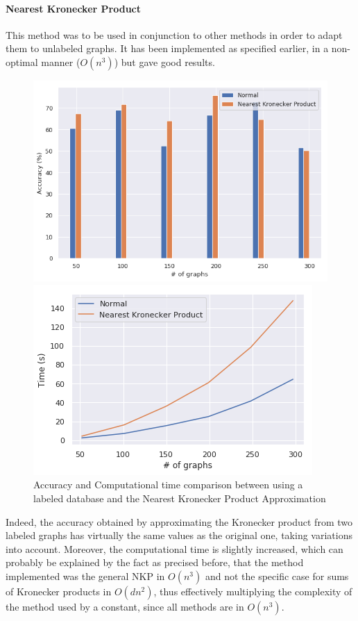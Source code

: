 \documentclass{article}
\theoremstyle{definition}
\begin{document}
\paragraph{Nearest Kronecker Product}
This method was to be used in conjunction to other methods in order to adapt them to unlabeled graphs. It has been implemented as specified earlier, in a non-optimal manner ($O(n^3)$) but gave good results. 
\begin{figure}[!htb]
	\begin{multicols}{2}
		\includegraphics[width=\linewidth]{data/nkp/acc.png}\par
		\includegraphics[width=\linewidth]{data/nkp/time.png}\par
	\end{multicols}
\caption{Accuracy and Computational time comparison between using a labeled database and the Nearest Kronecker Product Approximation}
\end{figure}Indeed, the accuracy obtained by approximating the Kronecker product from two labeled graphs has virtually the same values as the original one, taking variations into account. Moreover, the computational time is slightly increased, which can probably be explained by the fact as precised before, that the method implemented was the general NKP in $O(n^3)$ and not the specific case for sums of Kronecker products in $O(dn^2)$, thus effectively multiplying the complexity of the method used by a constant, since all methods are in $O(n^3)$.\\
\end{document}
